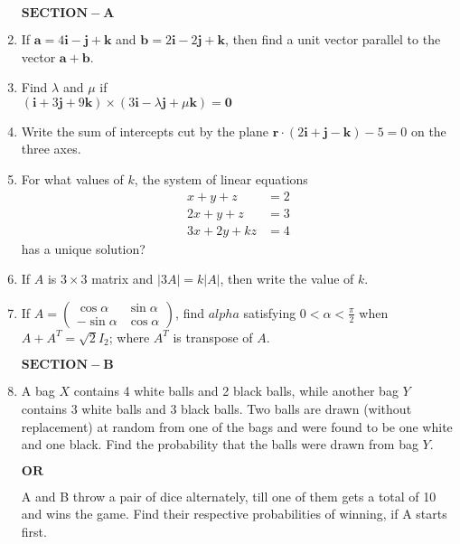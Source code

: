 \documentclass[12pt,-letter paper]{article}
\providecommand{\brak}[1]{\ensuremath{\left(#1\right)}}
\theoremstyle{remark}
\providecommand{\abs}[1]{\left\vert#1\right\vert}
\newcommand{\myvec}[1]{\ensuremath{\begin{pmatrix}#1\end{pmatrix}}}
\let\vec\mathbf
\begin{document}
\begin{enumerate}

\begin{center} $\vec{SECTION-A}$ \\ \end{center}
\item If $\vec{a} = 4\vec{i} -\vec{j} + \vec{k}$ and $\vec{b} = 2\vec{i} -2\vec{j} + \vec{k} $, then find a unit vector parallel to the vector $\vec{a} + \vec{b} $.\\

\item Find $\lambda$ and $\mu$ if\\
$\brak{\vec{i} + 3\vec{j} + 9\vec{k}}\times\brak{3\vec{i} - \lambda\vec{j} + \mu\vec{k}} = \vec{0}$\\

\item Write the sum of intercepts cut by the plane $\vec{r}\cdot\brak{2\vec{i} + \vec{j} - \vec{k}} - 5 = 0$ on the three axes.\\

\item For what values of $k$, the system of linear equations
\begin{align*}
x+y+z &= 2\\
2x+y+z &= 3\\
3x+2y+kz &= 4
\end{align*}
has a unique solution?\\

\item If $A$ is $3\times 3$ matrix and $\abs{3A} = k\abs{A}$, then write the value of $k$.\\

\item If $A = \myvec{\cos{\alpha} & \sin{\alpha}\\ -\sin{\alpha} & \cos{\alpha}}$, find $alpha$ satisfying $0 < \alpha < \frac{\pi}{2}$ when $A + A^T = \sqrt{2}I_2$; where $A^T$ is transpose of $A$.\\ 

\begin{center} $\vec{SECTION-B}$ \\ \end{center}

\item A bag $X$ contains 4 white balls and 2 black balls, while another bag $Y$ contains 3 white balls and 3 black balls. Two balls are drawn (without replacement) at random from one of the bags and were found to be one white and one black. Find the probability that the balls were drawn from bag $Y$.
\begin{center} $\vec{OR}$ \\ \end{center}
A and B throw a pair of dice alternately, till one of them gets a total of 10 and wins the game. Find their respective probabilities of winning, if A starts first.\\


\end{enumerate}
\end{document}

